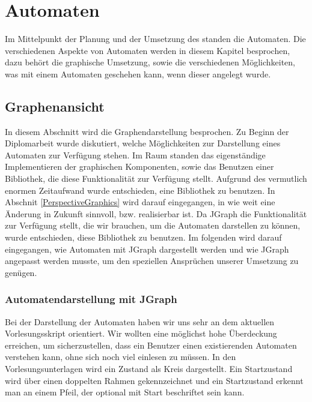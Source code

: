 

\chapter{Automaten}\label{Machines}

Im Mittelpunkt der Planung und der Umsetzung des \gtitools standen die
Automaten. Die verschiedenen Aspekte von Automaten werden in diesem Kapitel
besprochen, dazu behört die graphische Umsetzung, sowie die verschiedenen
Möglichkeiten, was mit einem Automaten geschehen kann, wenn dieser angelegt
wurde.


\section{Graphenansicht}

In diesem Abschnitt wird die Graphendarstellung besprochen. Zu Beginn der
Diplomarbeit wurde diskutiert, welche Möglichkeiten zur Darstellung eines
Automaten zur Verfügung stehen. Im Raum standen das eigenständige
Implementieren der graphischen Komponenten, sowie das Benutzen einer
Bibliothek, die diese Funktionalität zur Verfügung stellt. Aufgrund des
vermutlich enormen Zeitaufwand wurde entschieden, eine Bibliothek zu benutzen.
In Abschnit \ref{PerspectiveGraphics} wird darauf eingegangen, in wie weit eine
Änderung in Zukunft sinnvoll, bzw. realisierbar ist. Da JGraph die
Funktionalität zur Verfügung stellt, die wir brauchen, um die Automaten
darstellen zu können, wurde entschieden, diese Bibliothek zu benutzen. Im
folgenden wird darauf eingegangen, wie Automaten mit JGraph dargestellt werden
und wie JGraph angepasst werden musste, um den speziellen Ansprüchen unserer
Umsetzung zu genügen.


\subsection{Automatendarstellung mit JGraph}

Bei der Darstellung der Automaten haben wir uns sehr an dem aktuellen
Vorlesungsskript orientiert. Wir wollten eine möglichst hohe Überdeckung
erreichen, um sicherzustellen, dass ein Benutzer einen existierenden Automaten
verstehen kann, ohne sich noch viel einlesen zu müssen. In den
Vorlesungsunterlagen wird ein Zustand als Kreis dargestellt. Ein Startzustand
wird über einen doppelten Rahmen gekennzeichnet und ein Startzustand erkennt man
an einem Pfeil, der optional mit Start beschriftet sein kann.\vspace{10pt}

